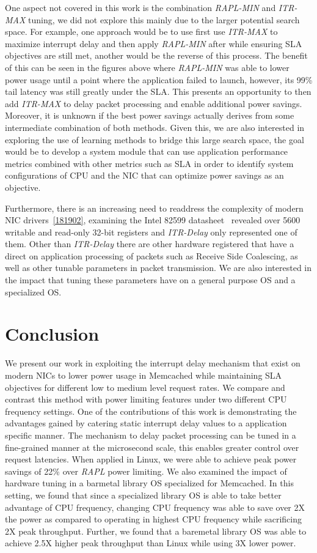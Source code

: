 \documentclass[letterpaper,twocolumn,10pt]{article}
\begin{document}
One aspect not covered in this work is the combination \textit{RAPL-MIN} and \textit{ITR-MAX} tuning, we did not explore this mainly due to the larger potential search space. For example, one approach would be to use first use \textit{ITR-MAX} to maximize interrupt delay and then apply \textit{RAPL-MIN} after while ensuring SLA objectives are still met, another would be the reverse of this process. The benefit of this can be seen in the figures above where \textit{RAPL-MIN} was able to lower power usage until a point where the application failed to launch, however, its 99\% tail latency was still greatly under the SLA. This presents an opportunity to then add \textit{ITR-MAX} to delay packet processing and enable additional power savings. Moreover, it is unknown if the best power savings actually derives from some intermediate combination of both methods. Given this, we are also interested in exploring the use of learning methods to bridge this large search space, the goal would be to develop a system module that can use application performance metrics combined with other metrics such as SLA in order to identify system configurations of CPU and the NIC that can optimize power savings as an objective.

Furthermore, there is an increasing need to readdress the complexity of modern NIC drivers~\ref{181902}, examining the Intel 82599 datasheet~\cite{82599} revealed over 5600 writable and read-only 32-bit registers and \textit{ITR-Delay} only represented one of them. Other than \textit{ITR-Delay} there are other hardware registered that have a direct on application processing of packets such as Receive Side Coalescing, as well as other tunable parameters in packet transmission. We are also interested in the impact that tuning these parameters have on a general purpose OS and a specialized OS. 

\section{Conclusion}
We present our work in exploiting the interrupt delay mechanism that exist on modern NICs to lower power usage in Memcached while maintaining SLA objectives for different low to medium level request rates. We compare and contrast this method with power limiting features under two different CPU frequency settings. One of the contributions of this work is demonstrating the advantages gained by catering static interrupt delay values to a application specific manner. The mechanism to delay packet processing can be tuned in a fine-grained manner at the microsecond scale, this enables greater control over request latencies. When applied in Linux, we were able to achieve peak power savings of 22\% over \textit{RAPL} power limiting. We also examined the impact of hardware tuning in a barmetal library OS specialized for Memcached. In this setting, we found that since a specialized library OS is able to take better advantage of CPU frequency, changing CPU frequency was able to save over 2X the power as compared to operating in highest CPU frequency while sacrificing 2X peak throughput. Further, we found that a baremetal library OS was able to achieve 2.5X higher peak throughput than Linux while using 3X lower power.




\end{document}
